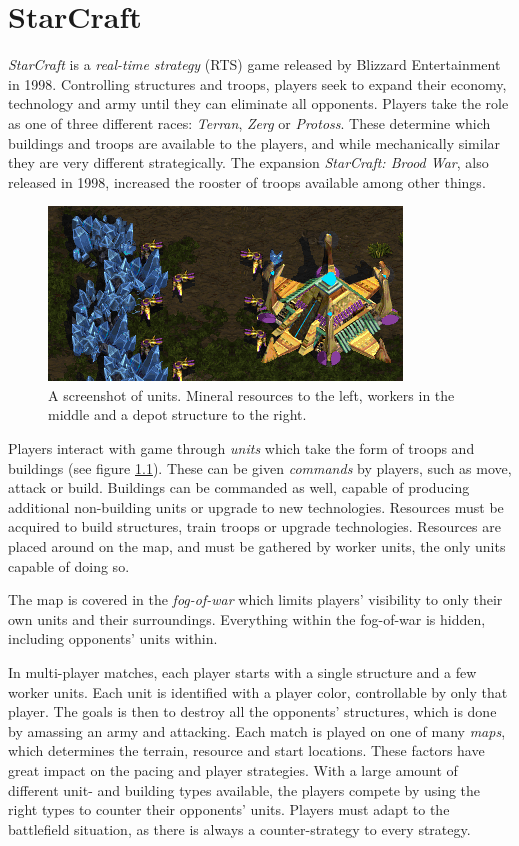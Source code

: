 \chapter{StarCraft}
\label{ch:starcraft}
\emph{StarCraft} is a \emph{real-time strategy} (RTS) game released by Blizzard Entertainment in 1998. Controlling structures and troops, players seek to expand their economy, technology and army until they can eliminate all opponents. Players take the role as one of three different races: \emph{Terran}, \emph{Zerg} or \emph{Protoss}. These determine which buildings and troops are available to the players, and while mechanically similar they are very different strategically. The expansion \emph{StarCraft: Brood War}, also released in 1998, increased the rooster of troops available among other things.

\begin{figure}
	\centering
	\includegraphics{figures/Base}
	\caption{A screenshot of units. Mineral resources to the left, workers in the middle and a depot structure to the right.}
	\label{fig:base}
\end{figure}

Players interact with game through \emph{units} which take the form of troops and buildings (see figure \ref{fig:base}). These can be given \emph{commands} by players, such as move, attack or build. Buildings can be commanded as well, capable of producing additional non-building units or upgrade to new technologies. Resources must be acquired to build structures, train troops or upgrade technologies. Resources are placed around on the map, and must be gathered by worker units, the only units capable of doing so.

The map is covered in the \emph{fog-of-war} which limits players' visibility to only their own units and their surroundings. Everything within the fog-of-war is hidden, including opponents' units within.

In multi-player matches, each player starts with a single structure and a few worker units. Each unit is identified with a player color, controllable by only that player. The goals is then to destroy all the opponents' structures, which is done by amassing an army and attacking. Each match is played on one of many \emph{maps}, which determines the terrain, resource and start locations. These factors have great impact on the pacing and player strategies. With a large amount of different unit- and building types available, the players compete by using the right types to counter their opponents' units. Players must adapt to the battlefield situation, as there is always a counter-strategy to every strategy.